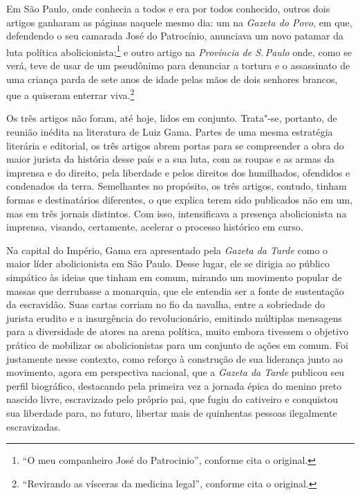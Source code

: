 \begin{multicols}{2}
Em São Paulo, onde conhecia a todos e era por todos conhecido, outros dois artigos ganharam as páginas naquele mesmo dia: um na \textit{Gazeta do Povo}, em que, defendendo o seu camarada José do Patrocínio, anunciava um novo patamar da luta política abolicionista;\footnote{``O meu companheiro José do Patrocinio'', conforme cita o original.} e outro artigo na \textit{Província de S.\,Paulo} onde, como se verá, teve de usar de um pseudônimo para denunciar a tortura e o assassinato de uma criança parda de sete anos de idade pelas mãos de dois senhores brancos, que a quiseram enterrar viva.\footnote{``Revirando as vísceras da medicina legal'', conforme cita o original.}

Os três artigos não foram, até hoje, lidos em conjunto. Trata"-se, portanto, de reunião inédita na literatura de Luiz Gama. Partes de uma mesma estratégia literária e editorial, os três artigos abrem portas para se compreender a obra do maior jurista da história desse país e a sua luta, com as roupas e as armas da imprensa e do direito, pela liberdade e pelos direitos dos humilhados, ofendidos e condenados da terra. Semelhantes no propósito, os três artigos, contudo, tinham formas e destinatários diferentes, o que explica terem sido publicados não em um, mas em três jornais distintos. Com isso, intensificava a presença abolicionista na imprensa, visando, certamente, acelerar o processo histórico em curso.

Na capital do Império, Gama era apresentado pela \textit{Gazeta da Tarde} como o maior líder abolicionista em São Paulo. Desse lugar, ele se dirigia ao público simpático às ideias que tinham em comum, mirando um movimento popular de massas que derrubasse a monarquia, que ele entendia ser a fonte de sustentação da escravidão. Suas cartas corriam no fio da navalha, entre a sobriedade do jurista erudito e a insurgência do revolucionário, emitindo múltiplas mensagens para a diversidade de atores na arena política, muito embora tivessem o objetivo prático de mobilizar os abolicionistas para um conjunto de ações em comum. Foi justamente nesse contexto, como reforço à construção de sua liderança junto ao movimento, agora em perspectiva nacional, que a \textit{Gazeta da Tarde} publicou seu perfil biográfico, destacando pela primeira vez a jornada épica do menino preto nascido livre, escravizado pelo próprio pai, que fugiu do cativeiro e conquistou sua liberdade para, no futuro, libertar mais de quinhentas pessoas ilegalmente escravizadas.

\bigskip
\noindent{}\textcolor{gray}{\footnotesize{}}
\end{multicols}

